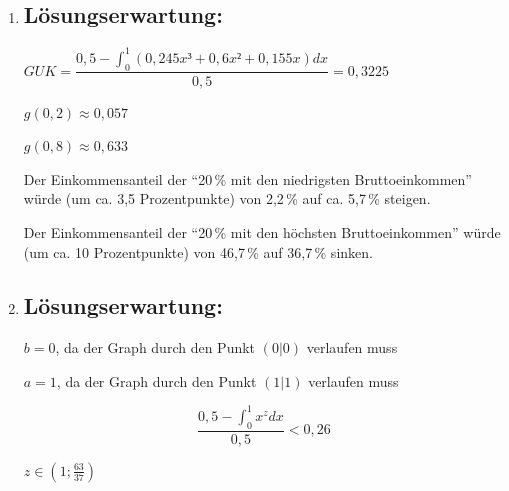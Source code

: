 \begin{langesbeispiel}
{\begin{enumerate}
	\textit{(Anmerkung: Bei "`besonderer"' Lage der Punkte kann auch ein Grad kleiner als fünf ausreichend sein.}\leer
	
	Jede Lorenz-Kurve verläuft durch den Punkt $(0|0)$. Da eine Exponentialfunktion $e$ mit $e(x)=a\cdot b^x$ $(a,b\in\mathbb{R}^+)$ nicht durch den Koordinatenursprung verläuft, ist sie nicht für die Modellierung geeignet.

\item \subsection{Lösungserwartung:}
	
$GUK=\dfrac{0,5-\int^1_0{(0,245x³+0,6x²+0,155x)dx}}{0,5}=0,3225$\leer

$g(0,2)\approx 0,057$

$g(0,8)\approx 0,633$\leer

Der Einkommensanteil der "`20\,\% mit den niedrigsten Bruttoeinkommen"' würde (um ca. 3,5 Prozentpunkte) von 2,2\,\% auf ca. 5,7\,\% steigen.\leer

Der Einkommensanteil der "`20\,\% mit den höchsten Bruttoeinkommen"' würde (um ca. 10 Prozentpunkte) von 46,7\,\% auf 36,7\,\% sinken.
\item \subsection{Lösungserwartung:}
	
$b=0$, da der Graph durch den Punkt $(0|0)$ verlaufen muss

$a=1$, da der Graph durch den Punkt $(1|1)$ verlaufen muss

$$\frac{0,5-\int^1_0{x^z}dx}{0,5}<0,26$$

$z\in\left(1;\frac{63}{37}\right)$

\end{enumerate}}
		\end{langesbeispiel}